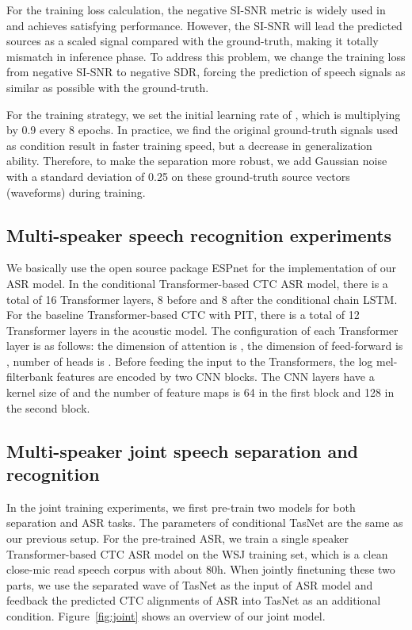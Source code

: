 \documentclass{article}
\begin{document}
For the training loss calculation, the negative SI-SNR metric is widely used in \cite{kaituo-tasnet,luo2018tasnet,luo2019conv,luo2019dual,nachmani2020voice} and achieves satisfying performance. However, the SI-SNR will lead the predicted sources as a scaled signal compared with the ground-truth, making it totally mismatch in inference phase. To address this problem, we change the training loss from negative SI-SNR to negative SDR, forcing the prediction of speech signals as similar as possible with the ground-truth.  

For the training strategy, we set the initial learning rate of , which is multiplying by 0.9 every 8 epochs. In practice, we find the original ground-truth signals used as condition result in faster training speed, but a decrease in generalization ability. Therefore, to make the separation more robust, we add Gaussian noise with a standard deviation of 0.25 on these ground-truth source vectors (waveforms) during training. 

\subsection{Multi-speaker speech recognition experiments}\label{appendix:asr}
We basically use the open source package ESPnet \cite{watanabe2018espnet} for the implementation of our ASR model. In the conditional Transformer-based CTC ASR model, there is a total of 16 Transformer layers, 8 before and 8 after the conditional chain LSTM. For the baseline Transformer-based CTC with PIT, there is a total of 12 Transformer layers in the acoustic model. The configuration of each Transformer layer is as follows: the dimension of attention is , the dimension of feed-forward is , number of heads is . Before feeding the input to the Transformers, the log mel-filterbank features are encoded by two CNN blocks. The CNN layers have a kernel size of  and the number of feature maps is 64 in the first block and 128 in the second block.

\subsection{Multi-speaker joint speech separation and recognition}\label{appendix:joint}
In the joint training experiments, we first pre-train two models for both separation and ASR tasks. The parameters of conditional TasNet are the same as our previous setup. For the pre-trained ASR, we train a single speaker Transformer-based CTC ASR model on the WSJ training set, which is a clean close-mic read speech corpus with about 80h. When jointly finetuning these two parts, we use the separated wave of TasNet as the input of ASR model and feedback the predicted CTC alignments of ASR into TasNet as an additional condition. Figure~\ref{fig:joint} shows an overview of our joint model.
\end{document}
